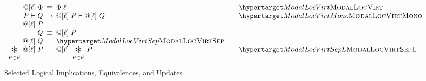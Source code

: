 \begin{figure}
  \[
  \begin{array}{r@{\;}c@{\;}lll}
\modaldef\ell\Phi
& \logequiv &
\modaldefunfold\ell\Phi
&& \TirNameStyle{ModalLocVirt}
\\

\modalP \vdash \modalQ & \rightarrow & \modaldef\ell\modalP \vdash \modaldef\ell\modalQ && \TirNameStyle{ModalLocVirtMono}
\\

\modaldef\ell{\modalstar\modalP\modalQ} & \logequiv & \modaldef\ell\modalP \star \modaldef\ell\modalQ &&\TirNameStyle{ModalLocVirtSep}
\\

   \bigast{\modalP \in \modalPs\modalP} { \modaldef\ell\modalP } & \vdash &
          \modaldef\ell{\bigast{\modalP \in \modalPs\modalP} {\modalP}} && \TirNameStyle{ModalLocVirtSepL}
  \end{array}
  \]
\caption{Selected Logical Implications, Equivalences, and Updates}
\label{fig:laws}
\end{figure}
